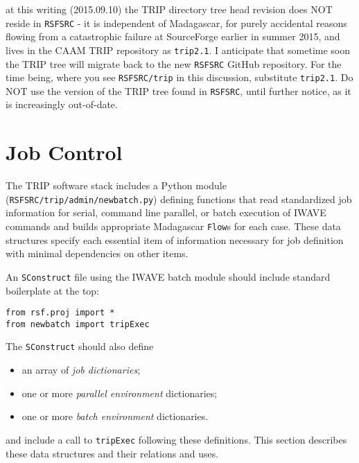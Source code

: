  at this writing (2015.09.10) the TRIP directory tree head revision does NOT reside in {\tt RSFSRC} - it is independent of Madagascar, for purely accidental reasons flowing from a catastrophic failure at SourceForge earlier in summer 2015, and lives in the CAAM TRIP repository as {\tt trip2.1}. I anticipate that sometime soon the TRIP tree will migrate back to the new {\tt RSFSRC} GitHub repository. For the time being, where you see {\tt RSFSRC/trip} in this discussion, substitute {\tt trip2.1}. Do NOT use the version of the TRIP tree found in {\tt RSFSRC}, until further notice, as it is increasingly out-of-date.

\section{Job Control}
The TRIP software stack includes a Python module ({\tt RSFSRC/trip/admin/newbatch.py}) defining functions that read standardized job information for serial, command line parallel, or batch execution of IWAVE commands and builds appropriate Madagascar {\tt Flow}s for each case. These data structures specify each essential item of information necessary for job definition with minimal dependencies on other items.

An {\tt SConstruct} file using the IWAVE batch module should include standard boilerplate at the top:
\begin{verbatim}
from rsf.proj import *
from newbatch import tripExec
\end{verbatim}
The {\tt SConstruct} should also define
\begin{itemize}
\item an array of {\em job dictionaries};
\item one or more {\em parallel environment} dictionaries;
\item one or more {\em batch environment} dictionaries.
\end{itemize}
and include a call to {\tt tripExec} following these definitions.
This section describes these data structures and their relations and uses. 
 

